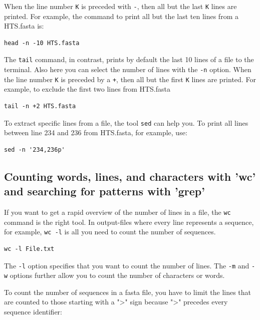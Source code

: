 \documentclass[11pt]{article}
\begin{document}
When the line number \texttt{K} is preceded with \texttt{-}, then all but the last \texttt{K}
lines are printed. For example, the command to print all but the last
ten lines from a HTS.fasta is:

\begin{verbatim}
head -n -10 HTS.fasta
\end{verbatim}

The \texttt{tail} command, in contrast, prints by default the last 10 lines
of a file to the terminal. Also here you can select the number of
lines with the \texttt{-n} option. When the line number \texttt{K} is preceded by a
\texttt{+}, then all but the first \texttt{K} lines are printed.  For example, to
exclude the first two lines from HTS.fasta

\begin{verbatim}
tail -n +2 HTS.fasta
\end{verbatim}


To extract specific lines from a file, the tool \texttt{sed} can help you. To
print all lines between line 234 and 236 from HTS.fasta, for example, use:

\begin{verbatim}
sed -n '234,236p'
\end{verbatim}



\subsection{Counting words, lines, and characters with 'wc' and searching for patterns with 'grep'}
\label{sec-4-2}
If you want to get a rapid overview of the number of lines in a file,
the \texttt{wc} command is the right tool. In output-files where
every line represents a sequence, for example, \texttt{wc -l} is all you need to count the
number of sequences.

\begin{verbatim}
wc -l File.txt
\end{verbatim}

The \texttt{-l} option specifies that you want to count the number of
lines. The \texttt{-m} and \texttt{-w} options further allow you to count the number
of characters or words.


To count the number of sequences in a fasta file, you have to limit
the lines that are counted to those starting with a ">" sign
because ">" precedes every sequence identifier:
\end{document}
